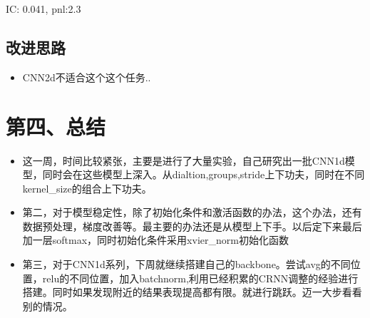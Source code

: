 \documentclass[11pt]{ctexart}
\begin{document}
{\kaishu \small IC: 0.041, pnl:2.3}


\subsection{改进思路}
\begin{itemize}
  \item [0)]
    CNN2d不适合这个这个任务..

\end{itemize}

\section{第四、总结}
\begin{itemize}
  \item [1)]
  这一周，时间比较紧张，主要是进行了大量实验，自己研究出一批CNN1d模型，同时会在这些模型上深入。从dialtion,groups,stride上下功夫，同时在不同kernel\_size的组合上下功夫。
  \item [2)]
  第二，对于模型稳定性，除了初始化条件和激活函数的办法，这个办法，还有数据预处理，梯度改善等。最主要的办法还是从模型上下手。以后定下来最后加一层softmax，同时初始化条件采用xvier\_norm初始化函数
  \item [3)]
  第三，对于CNN1d系列，下周就继续搭建自己的backbone。尝试avg的不同位置，relu的不同位置，加入batchnorm,利用已经积累的CRNN调整的经验进行搭建。同时如果发现附近的结果表现提高都有限。就进行跳跃。迈一大步看看别的情况。
\end{itemize}
\end{document}
